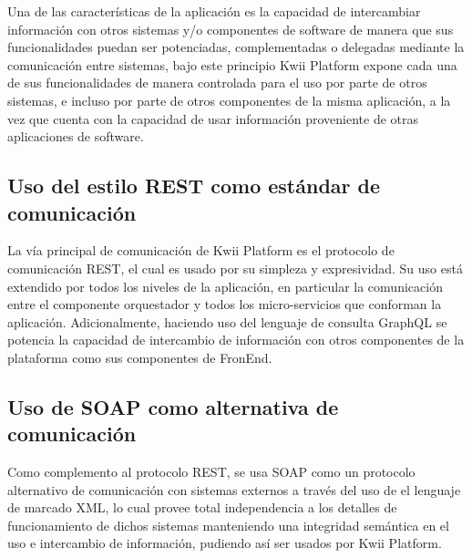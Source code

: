 Una de las características de la aplicación es la capacidad de intercambiar información con otros sistemas y/o componentes de software de manera que sus funcionalidades puedan ser potenciadas, complementadas o delegadas mediante la comunicación entre sistemas, bajo este principio Kwii Platform expone cada una de sus funcionalidades de manera controlada para el uso por parte de otros sistemas, e incluso por parte de otros componentes de la misma aplicación, a la vez que cuenta con la capacidad de usar información proveniente de otras aplicaciones de software.

\subsection{Uso del estilo REST como estándar de comunicación}
La vía principal de comunicación de Kwii Platform es el protocolo de comunicación REST, el cual es usado por su simpleza y expresividad. Su uso está extendido por todos los niveles de la aplicación, en particular la comunicación entre el componente orquestador y todos los micro-servicios que conforman la aplicación. Adicionalmente, haciendo uso del lenguaje de
consulta GraphQL se potencia la capacidad de intercambio de información con otros componentes de la plataforma como sus componentes de FronEnd.

\subsection{Uso de SOAP como alternativa de comunicación}
Como complemento al protocolo REST, se usa SOAP como un protocolo alternativo de comunicación con sistemas externos a través del uso de el lenguaje de marcado XML, lo cual provee total independencia a los detalles de funcionamiento de dichos sistemas manteniendo una integridad semántica en el uso e intercambio de información, pudiendo así ser usados por Kwii Platform.